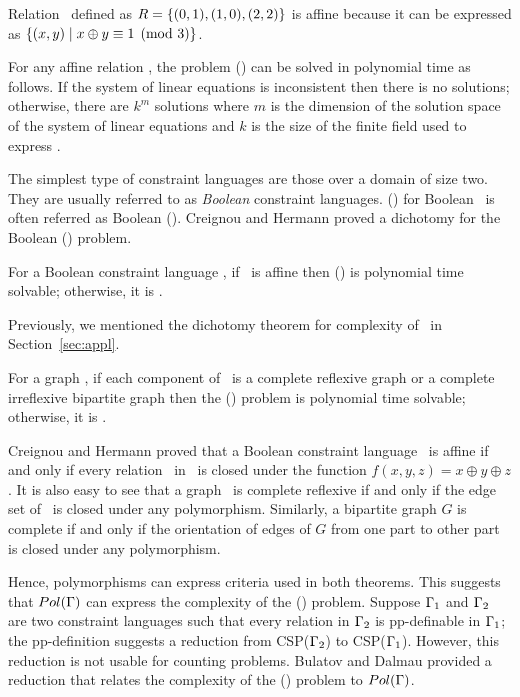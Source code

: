 \begin{example}
Relation \mR\ defined as \(R=\{{(0,1),(1,0),(2,2)}\}\) is affine because it can be expressed as 
\(\{{(x,y)\mid x \oplus y \equiv 1 \pmod{3}}\}\)\@.
\end{example}

For any affine relation \mR, the problem \ccsp(\mR) can be solved in polynomial time
as follows. If the system of linear equations is inconsistent
then there is no solutions; otherwise, there are \(k^m\) solutions where \(m\) is the
dimension of the solution space of the system of linear equations and
\(k\) is the size of the finite field used to express \mR\@.

The simplest type of constraint languages are those 
over a domain of size two. They are usually 
referred to as \emph{Boolean} constraint languages.
\ccsp(\mrelset) for Boolean \mrelset\ is often referred as Boolean \ccsp(\mrelset)\@.
Creignou and Hermann proved a dichotomy for the Boolean \ccsp(\mrelset) problem.

\begin{theorem}  
For a Boolean constraint language \mrelset,
if  \mrelset\ is affine then \ccsp(\mrelset) 
is polynomial time solvable; otherwise, it is \cpc\@.
\end{theorem}

Previously, we mentioned the dichotomy theorem for complexity of \ccsp\ in  Section~\ref{sec:appl}.

\begin{theorem} 
For a graph \mH, if each component of \mH\ is a complete reflexive graph
or a complete irreflexive bipartite graph then the \chom(\mH) problem 
is polynomial time solvable; otherwise, it is \cpc\@.
\end{theorem}

Creignou and Hermann \cite{Nadia} proved that a Boolean constraint language \mrelset\
is affine if and only if every relation \mR\ in \mrelset\
is closed under the function \(f(x,y,z)=x\oplus y \oplus z\). It is also easy to see that
a graph \mG\ is complete reflexive if and only if the edge set of \mG\ is closed under any
polymorphism. Similarly, a bipartite graph \(G\) is complete if and only if the orientation
of edges
of \(G\) from one part to other part is closed under any polymorphism.

Hence, polymorphisms can express criteria used in both theorems. This suggests
that \(Pol(\Gamma)\) can express the complexity of the \ccsp(\mrelset) problem.
Suppose \(\Gamma_1\) and \(\Gamma_2\) are two constraint languages such that
every relation in \(\Gamma_2\) is pp-definable in \(\Gamma_1\); 
the pp-definition suggests a reduction from CSP(\(\Gamma_2\))
to CSP(\(\Gamma_1\))\@. However, this reduction is not usable for counting problems. 
Bulatov and Dalmau provided a reduction that relates 
the complexity of the \ccsp(\mrelset) problem to \(Pol(\Gamma)\)\@.

